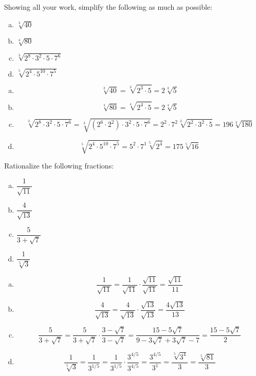\documentclass[11pt,letterpaper]{article}
\begin{document}
\newpage



 Showing all your work, simplify the following as much as possible:
        \begin{enumerate}[(a)]
        \item $\sqrt[3]{40}$
        \item $\sqrt[4]{80}$
        \item $\sqrt[3]{2^8 \cdot 3^2 \cdot 5 \cdot 7^6}$
        \item $\sqrt[5]{2^4 \cdot 5^{10} \cdot 7^5}$
        \end{enumerate} \pspace

\sol
\begin{enumerate}[(a)]
\item 
	\[
	\sqrt[3]{40}= \sqrt[3]{2^3 \cdot 5}= 2 \sqrt[3]{5}
	\] \pspace

\item 
	\[
	\sqrt[4]{80}= \sqrt[4]{2^4 \cdot 5}= 2 \sqrt[4]{5}
	\] \pspace

\item \[
	\sqrt[3]{2^8 \cdot 3^2 \cdot 5 \cdot 7^6}= \sqrt[3]{(2^6 \cdot 2^2) \cdot 3^2 \cdot 5 \cdot 7^6}= 2^2 \cdot 7^2 \sqrt[3]{2^2 \cdot 3^2 \cdot 5}= 196 \sqrt[3]{180}
	\] \pspace

\item \[
	\sqrt[5]{2^4 \cdot 5^{10} \cdot 7^5}= 5^2 \cdot 7^1 \sqrt[5]{2^4}= 175 \sqrt[5]{16}
	\]
\end{enumerate}



\newpage



 Rationalize the following fractions:
        \begin{enumerate}[(a)]
        \item $\dfrac{1}{\sqrt{11}}$
        \item $\dfrac{4}{\sqrt{13}}$
        \item $\dfrac{5}{3 + \sqrt{7}}$
        \item $\dfrac{1}{\sqrt[5]{3}}$
        \end{enumerate} \pspace

\sol
\begin{enumerate}[(a)]
\item 
	\[
	\dfrac{1}{\sqrt{11}}= \dfrac{1}{\sqrt{11}} \cdot \dfrac{\sqrt{11}}{\sqrt{11}}= \dfrac{\sqrt{11}}{11}
	\] \pspace

\item 
	\[
	\dfrac{4}{\sqrt{13}}= \dfrac{4}{\sqrt{13}} \cdot \dfrac{\sqrt{13}}{\sqrt{13}}= \dfrac{4 \sqrt{13}}{13}
	\] \pspace

\item 
	\[
	\dfrac{5}{3 + \sqrt{7}}= \dfrac{5}{3 + \sqrt{7}} \cdot \dfrac{3 - \sqrt{7}}{3 - \sqrt{7}}= \dfrac{15 - 5\sqrt{7}}{9 - 3\sqrt{7} + 3\sqrt{7} - 7}= \dfrac{15 - 5\sqrt{7}}{2}
	\] \pspace

\item 
	\[
	\dfrac{1}{\sqrt[5]{3}}= \dfrac{1}{3^{1/5}}= \dfrac{1}{3^{1/5}} \cdot \dfrac{3^{4/5}}{3^{4/5}}= \dfrac{3^{4/5}}{3^1}= \dfrac{\sqrt[5]{3^4}}{3}= \dfrac{\sqrt[5]{81}}{3}
	\]
\end{enumerate}
\end{document}
